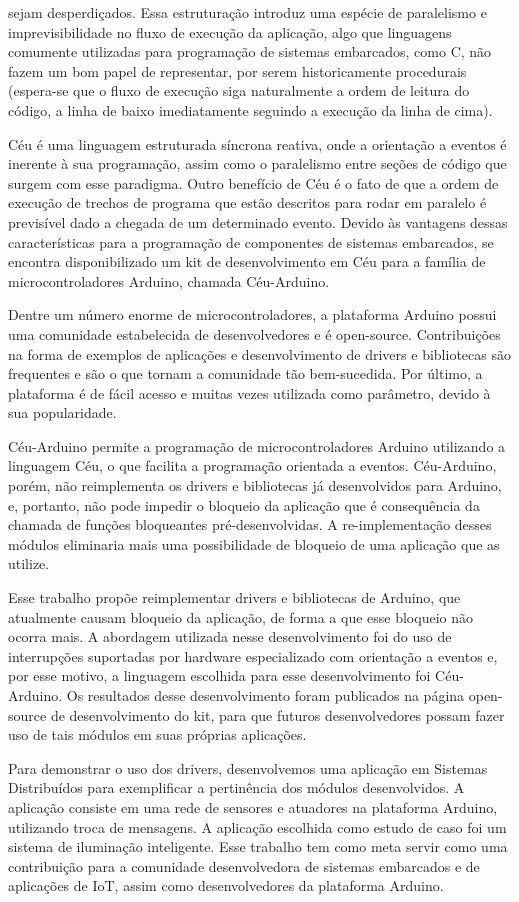 \documentclass[11pt]{article}
\begin{document}
sejam desperdiçados. Essa estruturação introduz uma espécie de paralelismo e imprevisibilidade no
fluxo de execução da aplicação, algo que linguagens comumente utilizadas para programação de
sistemas embarcados, como C, não fazem um bom papel de representar, por serem historicamente
procedurais (espera-se que o fluxo de execução siga naturalmente a ordem de leitura do código, a
linha de baixo imediatamente seguindo a execução da linha de cima).
\par Céu é uma linguagem estruturada síncrona reativa, onde a orientação a eventos é
inerente à sua programação, assim como o paralelismo entre seções de código que surgem com esse
paradigma. Outro benefício de Céu é o fato de que a ordem de execução de
trechos de programa que estão descritos para rodar em paralelo é previsível dado a chegada de um
determinado evento.\cite{santanna2012} Devido às vantagens dessas características para a programação de
componentes de sistemas embarcados, se encontra disponibilizado um kit de desenvolvimento em Céu para
a família de microcontroladores Arduino, chamada Céu-Arduino.
\par Dentre um número enorme de microcontroladores, a plataforma Arduino\cite{arduinoblog} possui uma comunidade estabelecida de desenvolvedores e é open-source. Contribuições na forma de exemplos de aplicações e desenvolvimento de drivers e bibliotecas são frequentes e são o que tornam a comunidade tão bem-sucedida. Por último, a plataforma é de fácil acesso e muitas vezes utilizada como parâmetro, devido à sua popularidade. 
\par Céu-Arduino permite a programação de microcontroladores Arduino utilizando a linguagem Céu, o
que facilita a programação orientada a eventos. Céu-Arduino, porém, não reimplementa os drivers e
bibliotecas já desenvolvidos para Arduino, e, portanto, não pode impedir o
bloqueio da aplicação que é consequência da chamada de funções bloqueantes pré-desenvolvidas. A
re-implementação desses módulos eliminaria mais uma possibilidade de bloqueio de uma aplicação
que as utilize.\cite{githubceuarduino}
\par Esse trabalho propõe reimplementar drivers e bibliotecas de Arduino, que atualmente causam
bloqueio da aplicação, de forma a que esse bloqueio não ocorra mais. A abordagem utilizada nesse
desenvolvimento foi do uso de interrupções suportadas por hardware especializado com orientação a
eventos e, por esse motivo, a linguagem escolhida para esse desenvolvimento foi Céu-Arduino. Os
resultados desse desenvolvimento foram publicados na página open-source de desenvolvimento do
kit, para que futuros desenvolvedores possam fazer uso de tais módulos em suas próprias aplicações.
\par Para demonstrar o uso dos drivers, desenvolvemos uma aplicação em Sistemas Distribuídos para exemplificar a pertinência
dos módulos desenvolvidos. A aplicação consiste em uma rede de sensores e atuadores na
plataforma Arduino, utilizando troca de mensagens. A aplicação escolhida como estudo de caso foi um sistema de iluminação inteligente. Esse trabalho tem como meta servir como uma contribuição
para a comunidade desenvolvedora de sistemas embarcados e de aplicações de IoT, assim como
desenvolvedores da plataforma Arduino.
\end{document}
